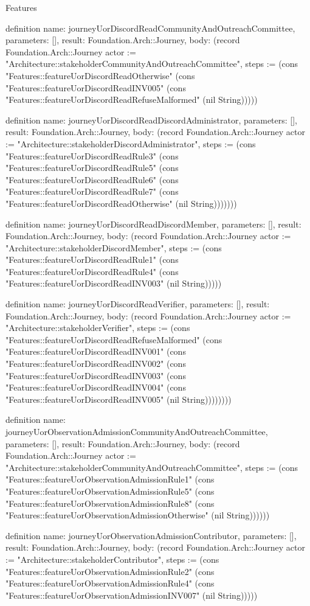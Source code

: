 \begin{lexlean}{Features}
\begin{semanticmodule}
definition{
  name: journeyUorDiscordReadCommunityAndOutreachCommittee,
  parameters: [],
  result: Foundation.Arch::Journey,
  body: (record Foundation.Arch::Journey {actor := "Architecture::stakeholderCommunityAndOutreachCommittee", steps := (cons "Features::featureUorDiscordReadOtherwise" (cons "Features::featureUorDiscordReadINV005" (cons "Features::featureUorDiscordReadRefuseMalformed" (nil String))))})
}

definition{
  name: journeyUorDiscordReadDiscordAdministrator,
  parameters: [],
  result: Foundation.Arch::Journey,
  body: (record Foundation.Arch::Journey {actor := "Architecture::stakeholderDiscordAdministrator", steps := (cons "Features::featureUorDiscordReadRule3" (cons "Features::featureUorDiscordReadRule5" (cons "Features::featureUorDiscordReadRule6" (cons "Features::featureUorDiscordReadRule7" (cons "Features::featureUorDiscordReadOtherwise" (nil String))))))})
}

definition{
  name: journeyUorDiscordReadDiscordMember,
  parameters: [],
  result: Foundation.Arch::Journey,
  body: (record Foundation.Arch::Journey {actor := "Architecture::stakeholderDiscordMember", steps := (cons "Features::featureUorDiscordReadRule1" (cons "Features::featureUorDiscordReadRule4" (cons "Features::featureUorDiscordReadINV003" (nil String))))})
}

definition{
  name: journeyUorDiscordReadVerifier,
  parameters: [],
  result: Foundation.Arch::Journey,
  body: (record Foundation.Arch::Journey {actor := "Architecture::stakeholderVerifier", steps := (cons "Features::featureUorDiscordReadRefuseMalformed" (cons "Features::featureUorDiscordReadINV001" (cons "Features::featureUorDiscordReadINV002" (cons "Features::featureUorDiscordReadINV003" (cons "Features::featureUorDiscordReadINV004" (cons "Features::featureUorDiscordReadINV005" (nil String)))))))})
}

definition{
  name: journeyUorObservationAdmissionCommunityAndOutreachCommittee,
  parameters: [],
  result: Foundation.Arch::Journey,
  body: (record Foundation.Arch::Journey {actor := "Architecture::stakeholderCommunityAndOutreachCommittee", steps := (cons "Features::featureUorObservationAdmissionRule1" (cons "Features::featureUorObservationAdmissionRule5" (cons "Features::featureUorObservationAdmissionRule8" (cons "Features::featureUorObservationAdmissionOtherwise" (nil String)))))})
}

definition{
  name: journeyUorObservationAdmissionContributor,
  parameters: [],
  result: Foundation.Arch::Journey,
  body: (record Foundation.Arch::Journey {actor := "Architecture::stakeholderContributor", steps := (cons "Features::featureUorObservationAdmissionRule2" (cons "Features::featureUorObservationAdmissionRule4" (cons "Features::featureUorObservationAdmissionINV007" (nil String))))})
}


\end{semanticmodule}
\end{lexlean}
